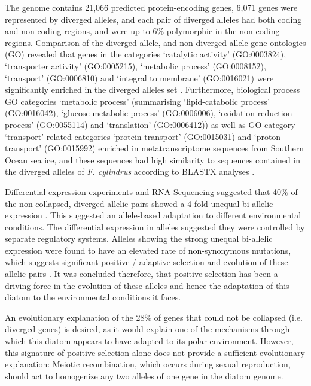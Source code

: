 The genome contains 21,066 predicted protein-encoding genes, 6,071 genes were represented by diverged alleles, and each pair of diverged alleles had both coding and non-coding regions, and were up to 6\% polymorphic in the non-coding regions.
Comparison of the diverged allele, and non-diverged allele gene ontologies (GO) revealed that genes in the categories ‘catalytic activity’ (GO:0003824), ‘transporter activity’ (GO:0005215), ‘metabolic process’ (GO:0008152), ‘transport’ (GO:0006810) and ‘integral to membrane’ (GO:0016021) were significantly enriched in the diverged alleles set \parencite{Mock2017}.
Furthermore, biological process GO categories ‘metabolic process’ (summarising ‘lipid-catabolic process’ (GO:0016042), ‘glucose metabolic process’ (GO:0006006), ‘oxidation-reduction process’ (GO:0055114) and ‘translation’ (GO:0006412)) as well as GO category ‘transport’-related categories ‘protein transport’ (GO:0015031) and ‘proton transport’ (GO:0015992) enriched in metatranscriptome sequences from Southern Ocean sea ice, and these sequences had high similarity to sequences contained in the diverged alleles of \textit{F. cylindrus} according to BLASTX analyses \parencite{Mock2017}.

Differential expression experiments and RNA-Sequencing suggested that 40\% of
the non-collapsed, diverged allelic pairs showed a 4 fold unequal bi-allelic
expression \parencite{Mock2017}.
This suggested an allele-based adaptation to different environmental conditions.
The differential expression in alleles suggested they were controlled by
separate regulatory systems.
Alleles showing the strong unequal bi-allelic expression were found to have an
elevated rate of non-synonymous mutations, which suggests significant positive
/ adaptive selection and evolution of these allelic pairs \parencite{Mock2017}.
It was concluded therefore, that positive selection has been a driving force in
the evolution of these alleles and hence the adaptation of this diatom to the
environmental conditions it faces.

An evolutionary explanation of the 28\% of genes that could not be collapsed
(i.e. diverged genes) is desired, as it would explain one of the mechanisms
through which this diatom appears to have adapted to its polar environment.
However, this signature of positive selection alone does not provide a
sufficient evolutionary explanation: Meiotic recombination, which occurs during
sexual reproduction, should act to homogenize any two alleles of one gene in the
diatom genome.

